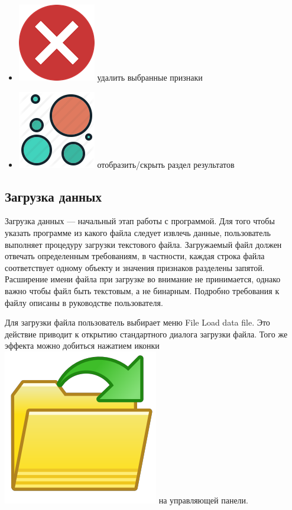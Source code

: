 \documentclass[12pt]{diploma}
\begin{document}
\begin{itemize}
		\item \includegraphics[scale=0.1]{img/delete} удалить выбранные признаки
		\item \includegraphics[scale=0.1]{img/clustering} отобразить/скрыть раздел результатов
	\end{itemize}
	
	\subsection{Загрузка данных}
	
	Загрузка данных --- начальный этап работы с программой. Для того чтобы указать программе из какого файла следует извлечь данные, пользователь выполняет процедуру загрузки текстового файла. Загружаемый файл должен отвечать определенным требованиям, в частности, каждая строка файла соответствует одному объекту и значения признаков разделены запятой. Расширение имени файла при загрузке во внимание не принимается, однако важно чтобы файл быть текстовым, а не бинарным. Подробно требования к файлу описаны в руководстве пользователя. 
	
	Для загрузки файла пользователь выбирает меню File \textrightarrow Load data file. Это действие приводит к открытию стандартного диалога загрузки файла. Того же эффекта можно добиться нажатием иконки \includegraphics[scale=0.05]{img/folder-ico} на управляющей панели.
	
\end{document}
